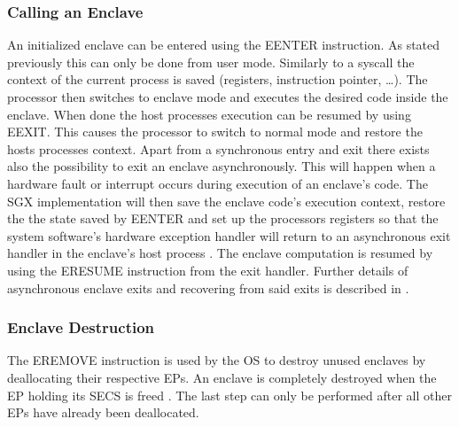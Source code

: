 \subsubsection{Calling an Enclave}
An initialized enclave can be entered using the EENTER instruction. As stated previously this can only be done from user mode. Similarly to a syscall the context of the current
process is saved (registers, instruction pointer, \dots). The processor then switches to enclave mode and executes the desired code inside the enclave. When done the host processes
execution can be resumed by using EEXIT. This causes the processor to switch to normal mode and restore the hosts processes context. Apart from a synchronous entry and exit there
exists also the possibility to exit an enclave asynchronously. This will happen when a hardware fault or interrupt occurs during execution of an enclave's code. The SGX
implementation will then save the enclave code's execution context, restore the the state saved by EENTER and set up the processors registers so that the system software’s hardware 
exception handler will return to an asynchronous exit handler in the enclave’s host process \cite{Costan2016IntelSE}. The enclave computation is resumed by using the ERESUME
instruction from the exit handler. Further details of asynchronous enclave exits and recovering from said exits is described in \cite{Costan2016IntelSE}.

\subsubsection{Enclave Destruction}
The EREMOVE instruction is used by the OS to destroy unused enclaves by deallocating their respective EPs. An enclave is completely destroyed when the EP holding its SECS is freed
\cite{Costan2016IntelSE}. The last step can only be performed after all other EPs have already been deallocated.